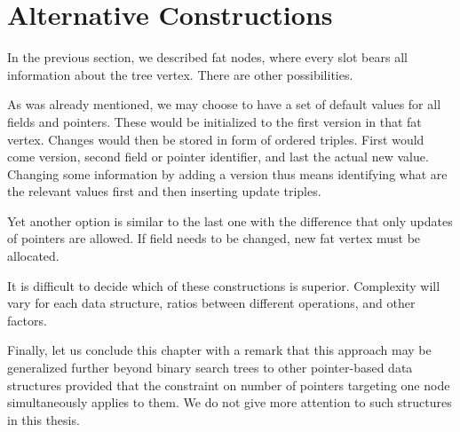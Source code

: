 \section{Alternative Constructions}

In the previous section, we described fat nodes, where every slot bears all information about the tree vertex. There are other possibilities.

As was already mentioned, we may choose to have a set of default values for all fields and pointers.
These would be initialized to the first version in that fat vertex. Changes would then be stored in form of ordered triples. First would come version, second field or pointer identifier, and last the actual new value. Changing some information by adding a version thus means identifying what are the relevant values first and then inserting update triples.

Yet another option is similar to the last one with the difference that only updates of pointers are allowed. If field needs to be changed, new fat vertex must be allocated.

It is difficult to decide which of these constructions is superior. Complexity will vary for each data structure, ratios between different operations, and other factors.

Finally, let us conclude this chapter with a remark that this approach may be generalized further beyond binary search trees to other pointer-based data structures provided that the constraint on number of pointers targeting one node simultaneously applies to them.
We do not give more attention to such structures in this thesis.
